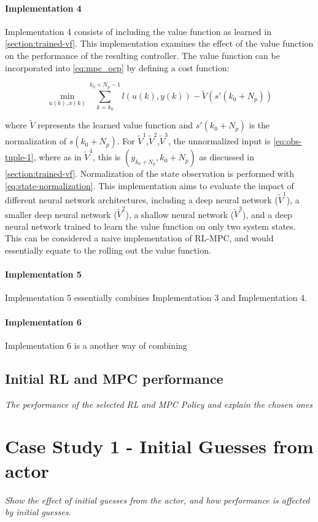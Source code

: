 \paragraph{Implementation 4}
Implementation 4 consists of including the value function as learned in \autoref{section:trained-vf}. This implementation examines the effect of the value function on the performance of the resulting controller. The value function can be incorporated into \autoref{eq:mpc_ocp} by defining a cost function:

\begin{equation}\label{eq:cost-function}
		\min_{u(k),x(k)}  \sum_{k = k_0}^{k_0 + N_p - 1}{l(u(k), y(k))} - \tilde{V}(s'(k_0 + N_p))
\end{equation}

where $\tilde{V}$ represents the learned value function and $s'(k_0+N_p)$ is the normalization of $s(k_0+N_p)$. For $\tilde{V}^1$,$\tilde{V}^2$,$\tilde{V}^3$, the unnormalized input is \autoref{eq:obs-tuple-1}, where as in $\tilde{V}^4$, this is $(y_{k_0+N_p},k_0+N_p)$ as discussed in \autoref{section:trained-vf}. Normalization of the state observation is performed with \autoref{eq:state-normalization}. This implementation aims to evaluate the impact of different neural network architectures, including a deep neural network ($\tilde{V}^1$), a smaller deep neural network ($\tilde{V}^2$), a shallow neural network ($\tilde{V}^3$), and a deep neural network trained to learn the value function on only two system states. This can be considered a naive implementation of RL-MPC, and would essentially equate to the rolling out the value function.

\paragraph{Implementation 5}
Implementation 5 essentially combines Implementation 3 and Implementation 4.

\paragraph{Implementation 6}
Implementation 6 is a another way of combining 
\subsection{Initial RL and MPC performance}
\emph{The performance of the selected RL and MPC Policy and explain the chosen ones}

\section{Case Study 1 - Initial Guesses from actor}
\emph{Show the effect of initial guesses from the actor, and how performance is affected by initial guesses.}

